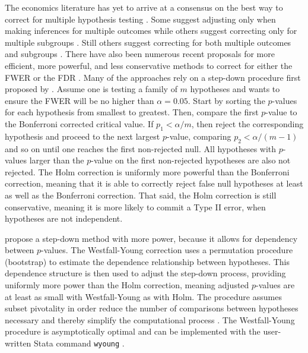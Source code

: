\documentclass[11pt]{article}
\begin{document}
The economics literature has yet to arrive at a consensus on the best way to correct for multiple hypothesis testing \citep{viviano_when_2021}. Some suggest adjusting only when making inferences for multiple outcomes \citep{anderson_multiple_2008, casey_reshaping_2012, heckman_inference_2011, kling_experimental_2007} while others suggest correcting only for multiple subgroups \citep{lee_multiple_2014}. Still others suggest correcting for both multiple outcomes and subgroups \citep{heckman_analyzing_2010}. There have also been numerous recent proposals for more efficient, more powerful, and less conservative methods to correct for either the FWER or the FDR \citep{romano_hypothesis_2010}. Many of the approaches rely on a step-down procedure first proposed by \cite{holm_simple_1979}. Assume one is testing a family of $m$ hypotheses and wants to ensure the FWER will be no higher than $\alpha = 0.05$. Start by sorting the $p$-values for each hypothesis from smallest to greatest. Then, compare the first $p$-value to the Bonferroni corrected critical value. If $p_1 < \alpha \slash m$, then reject the corresponding hypothesis and proceed to the next largest $p$-value, comparing $p_2 < \alpha \slash (m-1)$ and so on until one reaches the first non-rejected null. All hypotheses with $p$-values larger than the $p$-value on the first non-rejected hypotheses are also not rejected. The Holm correction is uniformly more powerful than the Bonferroni correction, meaning that it is able to correctly reject false null hypotheses at least as well as the Bonferroni correction. That said, the Holm correction is still conservative, meaning it is more likely to commit a Type II error, when hypotheses are not independent.

\cite{westfall_resampling_1993} propose a step-down method with more power, because it allows for dependency between $p$-values. The Westfall-Young correction uses a permutation procedure (bootstrap) to estimate the dependence relationship between hypotheses. This dependence structure is then used to adjust the step-down process, providing uniformly more power than the Holm correction, meaning adjusted $p$-values are at least as small with Westfall-Young as with Holm. The procedure assumes subset pivotality in order reduce the number of comparisons between hypotheses necessary and thereby simplify the computational process \citep{westfall_multiple_2008}. The Westfall-Young procedure is asymptotically optimal \citep{meinshausen_asymptotic_2011} and can be implemented with the user-written Stata command \texttt{wyoung} \citep{reif_wyoung_2017}.
\end{document}
